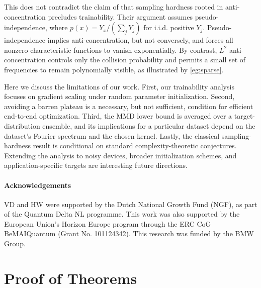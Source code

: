 \documentclass{article}
\theoremstyle{plain}
\theoremstyle{definition}
\theoremstyle{remark}
\begin{document}
This does not contradict the claim of \citet{herbst25} that sampling hardness rooted in anti-concentration precludes trainability. Their argument assumes pseudo-independence, where $p(x)=Y_x/(\sum_jY_j)$ for i.i.d. positive $Y_j$. Pseudo-independence implies anti-concentration, but not conversely, and forces all nonzero characteristic functions to vanish exponentially. By contrast, $L^2$ anti-concentration controls only the collision probability and permits a small set of frequencies to remain polynomially visible, as illustrated by \cref{eg:sparse}.

Here we discuss the limitations of our work. First, our trainability analysis focuses on gradient scaling under random parameter initialization. Second, avoiding a barren plateau is a necessary, but not sufficient, condition for efficient end-to-end optimization. Third, the MMD lower bound is averaged over a target-distribution ensemble, and its implications for a particular dataset depend on the dataset's Fourier spectrum and the chosen kernel. Lastly, the classical sampling-hardness result is conditional on standard complexity-theoretic conjectures. Extending the analysis to noisy devices, broader initialization schemes, and application-specific targets are interesting future directions.

\paragraph{Acknowledgements} VD and HW were supported by the Dutch National Growth Fund (NGF), as part of the Quantum Delta NL programme.
This work was also supported by the European Union’s Horizon Europe program through the ERC CoG BeMAIQuantum (Grant No. 101124342). This research was funded by the BMW Group. 

\newpage




\appendix

\onecolumn
\section{Proof of Theorems}
\end{document}
